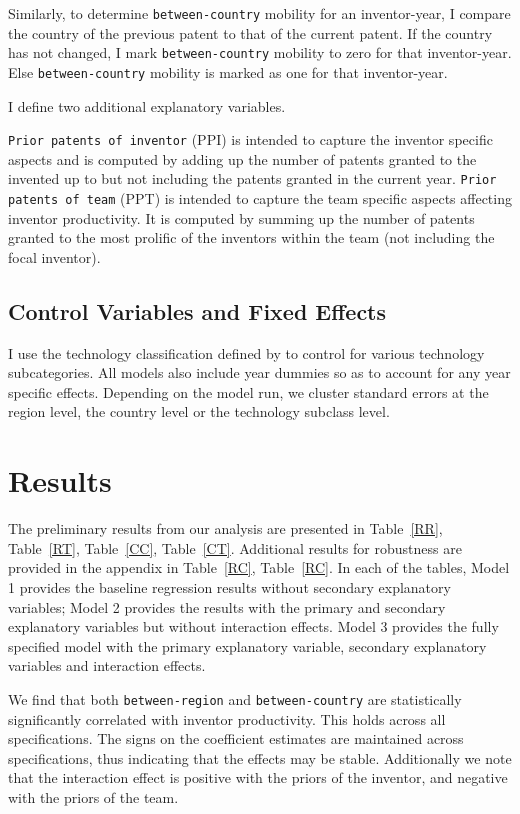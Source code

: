 \documentclass[12pt]{article}
\begin{document}
Similarly, to determine \texttt{between-country} mobility for an inventor-year,  I  compare the country  of the previous patent to that of the current patent. If the country has not changed, I mark \texttt{between-country} mobility to zero for that inventor-year. Else \texttt{between-country} mobility is marked as one for that inventor-year.\par

I define two additional explanatory variables. \par
\texttt{Prior patents of inventor} (PPI) is intended to capture the inventor specific aspects and is computed by adding up the number of patents granted to the invented up to but not including the patents granted in the current year. \texttt{Prior patents of team} (PPT) is intended to capture the team specific aspects affecting inventor productivity. It is computed by summing up the number of patents granted to the most prolific of the inventors within the team (not including the focal inventor).

\subsection{Control Variables and Fixed Effects}
I use the technology classification defined by  \cite{Hall2001} to control for various technology subcategories. All models also include  year dummies so as to account for any year specific effects. Depending on the model run, we cluster standard errors at the region level, the country level or the technology subclass level.
\newpage
\section{Results}

The preliminary results from our analysis are presented in Table~\ref{RR},  Table~\ref{RT}, Table~\ref{CC},  Table~\ref{CT}. Additional results for robustness are provided in the appendix in Table~\ref{RC},  Table~\ref{RC}. In each of the tables, Model 1 provides the baseline regression results without secondary explanatory variables; Model 2 provides the results with the primary and secondary explanatory variables but without interaction effects. Model 3 provides the fully specified model with the primary explanatory variable, secondary explanatory variables and interaction effects. \par

We find that both \texttt{between-region} and \texttt{between-country} are statistically significantly correlated with inventor productivity. This holds across all specifications. The  signs on the coefficient estimates are maintained across specifications, thus indicating that the effects may be stable. Additionally we note that the interaction effect is positive with the priors of the inventor, and negative with the priors of the team.
\end{document}
